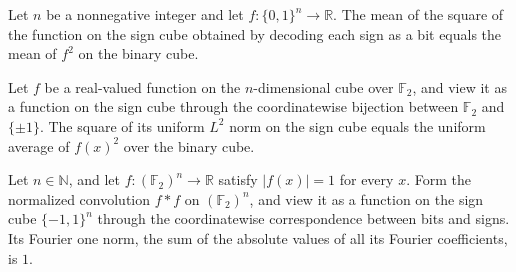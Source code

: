 \begin{theorem}
\label{FABL.mean_sq_binaryFunctionOnSignCube}
\leanok
{}
Let $n$ be a nonnegative integer and let $f:\{0,1\}^n\to\mathbb R$. The mean of the
square of the function on the sign cube obtained by decoding each sign as a bit equals
the mean of $f^2$ on the binary cube.
\end{theorem}

\begin{theorem}
\label{FABL.uniformLpNorm_two_sq_binaryFunctionOnSignCube}
\leanok
{}
Let $f$ be a real-valued function on the $n$-dimensional cube over $\mathbb F_2$, and
view it as a function on the sign cube through the coordinatewise bijection between
$\mathbb F_2$ and $\{\pm1\}$. The square of its uniform $L^2$ norm on the sign cube
equals the uniform average of $f(x)^2$ over the binary cube.
\end{theorem}

\begin{theorem}
\label{FABL.fourierOneNorm_binaryFunctionOnSignCube_convolution_self_eq_one}
\leanok
{}
Let $n\in\mathbb N$, and let $f:(\mathbb F_2)^n\to\mathbb R$ satisfy $|f(x)|=1$ for
every $x$. Form the normalized convolution $f*f$ on $(\mathbb F_2)^n$, and view it as a
function on the sign cube $\{-1,1\}^n$ through the coordinatewise correspondence between
bits and signs. Its Fourier one norm, the sum of the absolute values of all its Fourier
coefficients, is $1$.
\end{theorem}

